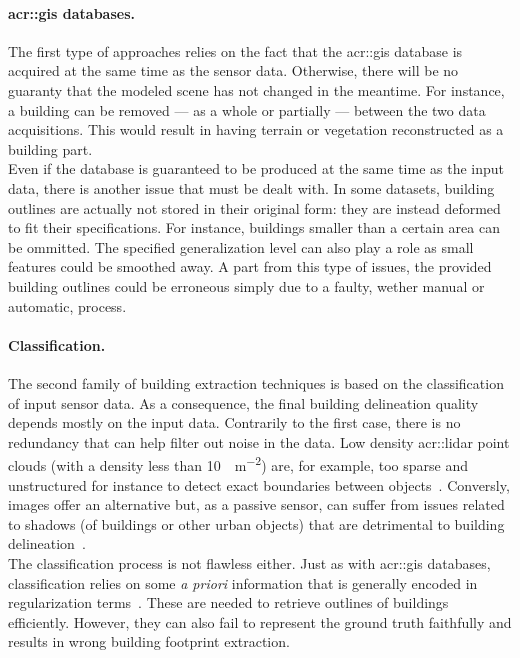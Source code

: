         \paragraph{\gls{acr::gis} databases.}
            The first type of approaches relies on the fact that the \gls{acr::gis} database is acquired at the same time as the sensor data.
            Otherwise, there will be no guaranty that the modeled scene has not changed in the meantime.
            For instance, a building can be removed --- as a whole or partially --- between the two data acquisitions.
            This would result in having terrain or vegetation reconstructed as a building part.\\

            Even if the database is guaranteed to be produced at the same time as the input data, there is another issue that must be dealt with.
            In some datasets, building outlines are actually not stored in their original form: they are instead deformed to fit their specifications.
            For instance, buildings smaller than a certain area can be ommitted.
            The specified generalization level can also play a role as small features could be smoothed away.
            A part from this type of issues, the provided building outlines could be erroneous simply due to a faulty, wether manual or automatic, process.\\
        
        \paragraph{Classification.}
            The second family of building extraction techniques is based on the classification of input sensor data.
            As a consequence, the final building delineation quality depends mostly on the input data.
            Contrarily to the first case, there is no redundancy that can help filter out noise in the data.
            Low density \gls{acr::lidar} point clouds (with a density less than \SI{10}{\pts\per\m \squared}) are, for example, too sparse and unstructured for instance to detect exact boundaries between objects~\parencite{michelin2012building}.
            Conversly, images offer an alternative but, as a passive sensor, can suffer from issues related to shadows (of buildings or other urban objects) that are detrimental to building delineation~\parencite{adeline2013shadow}.\\

            The classification process is not flawless either.
            Just as with \gls{acr::gis} databases, classification relies on some \textit{a priori} information that is generally encoded in regularization terms~\parencite{lafarge2008structural,zhu2018large,zeng2018neural}.
            These are needed to retrieve outlines of buildings efficiently.
            However, they can also fail to represent the ground truth faithfully and results in wrong building footprint extraction.

